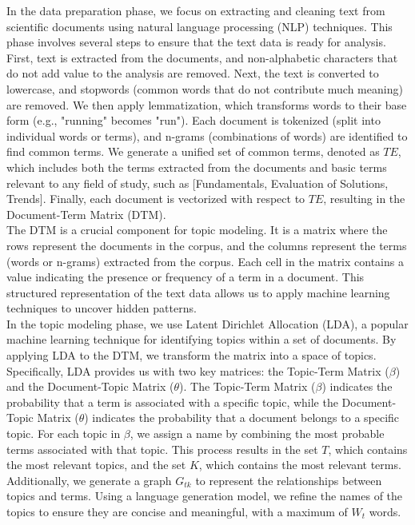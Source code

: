 \documentclass[runningheads]{llncs}
\begin{document}
In the data preparation phase, we focus on extracting and cleaning text from scientific documents using natural language processing (NLP) techniques. This phase involves several steps to ensure that the text data is ready for analysis. First, text is extracted from the documents, and non-alphabetic characters that do not add value to the analysis are removed. Next, the text is converted to lowercase, and stopwords (common words that do not contribute much meaning) are removed. We then apply lemmatization, which transforms words to their base form (e.g., "running" becomes "run"). Each document is tokenized (split into individual words or terms), and n-grams (combinations of words) are identified to find common terms. We generate a unified set of common terms, denoted as $TE$, which includes both the terms extracted from the documents and basic terms relevant to any field of study, such as [Fundamentals, Evaluation of Solutions, Trends]. Finally, each document is vectorized with respect to $TE$, resulting in the Document-Term Matrix (DTM).\\

The DTM is a crucial component for topic modeling. It is a matrix where the rows represent the documents in the corpus, and the columns represent the terms (words or n-grams) extracted from the corpus. Each cell in the matrix contains a value indicating the presence or frequency of a term in a document. This structured representation of the text data allows us to apply machine learning techniques to uncover hidden patterns.\\

In the topic modeling phase, we use Latent Dirichlet Allocation (LDA), a popular machine learning technique for identifying topics within a set of documents. By applying LDA to the DTM, we transform the matrix into a space of topics. Specifically, LDA provides us with two key matrices: the Topic-Term Matrix ($\beta$) and the Document-Topic Matrix ($\theta$). The Topic-Term Matrix ($\beta$) indicates the probability that a term is associated with a specific topic, while the Document-Topic Matrix ($\theta$) indicates the probability that a document belongs to a specific topic. For each topic in $\beta$, we assign a name by combining the most probable terms associated with that topic. This process results in the set $T$, which contains the most relevant topics, and the set $K$, which contains the most relevant terms. Additionally, we generate a graph $G_{tk}$ to represent the relationships between topics and terms. Using a language generation model, we refine the names of the topics to ensure they are concise and meaningful, with a maximum of $W_{t}$ words.\\
\end{document}
